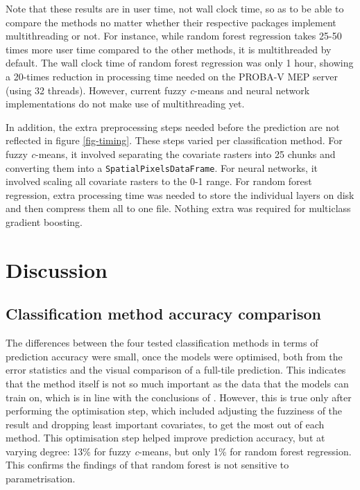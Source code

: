 \documentclass[a4paper,12pt]{scrbook}
\begin{document}
Note that these results are in user time, not wall clock time, so as to be able to compare the methods no matter whether their respective packages implement multithreading or not. For instance, while random forest regression takes 25-50 times more user time compared to the other methods, it is multithreaded by default. The wall clock time of random forest regression was only 1 hour, showing a 20-times reduction in processing time needed on the PROBA-V MEP server (using 32 threads). However, current fuzzy \textit{c}-means and neural network implementations do not make use of multithreading yet.

In addition, the extra preprocessing steps needed before the prediction are not reflected in figure \ref{fig-timing}. These steps varied per classification method. For fuzzy \textit{c}-means, it involved separating the covariate rasters into 25 chunks and converting them into a \texttt{SpatialPixelsDataFrame}. For neural networks, it involved scaling all covariate rasters to the 0-1 range. For random forest regression, extra processing time was needed to store the individual layers on disk and then compress them all to one file. Nothing extra was required for multiclass gradient boosting.

\chapter{Discussion}

\section{Classification method accuracy comparison}

The differences between the four tested classification methods in terms of prediction accuracy were small, once the models were optimised, both from the error statistics and the visual comparison of a full-tile prediction. This indicates that the method itself is not so much important as the data that the models can train on, which is in line with the conclusions of \citet{yu2014metadiscoveries}. However, this is true only after performing the optimisation step, which included adjusting the fuzziness of the result and dropping least important covariates, to get the most out of each method. This optimisation step helped improve prediction accuracy, but at varying degree: 13\% for fuzzy \textit{c}-means, but only 1\% for random forest regression. This confirms the findings of \citet{Pelletier2016hardrf} that random forest is not sensitive to parametrisation.
\end{document}
